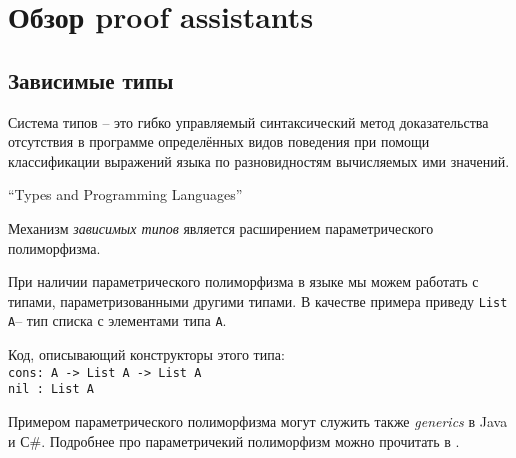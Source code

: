 \documentclass[aps,12pt,final,oneside,onecolumn,musixtex,superscriptaddress,centertags]{article}
\newcommand{\ctab}[0]{\indent\indent}
\newcommand{\ccode}[1]{\mbox{\texttt{#1}}}
\begin{document}
  \section{Обзор proof assistants}
  \subsection{Зависимые типы}

     \setlength{\epigraphwidth}{10cm}
     \epigraph{Система типов -- это гибко управляемый синтаксический метод доказательства отсутствия в программе определённых видов поведения при помощи классификации выражений языка по разновидностям вычисляемых ими значений.}{``Types and Programming Languages''\cite{Pierce:2002:TPL:509043}}

     Механизм \emph{зависимых типов} является расширением параметрического полиморфизма.

     \newcommand{\listtype}[0]{\ccode{List A}} 
     \newcommand{\listcons}[0]{\ccode{cons\hspace{2mm}: A -> List A -> List A}}
     \newcommand{\listnil}[0]{\ccode{nil \hspace{2mm}: List A}}
     \newcommand{\listconst}[0]{
        \ctab\listcons\\
        \ctab\listnil
     }

     При наличии параметрического полиморфизма в языке мы можем работать с типами, параметризованными другими типами. В качестве примера приведу \listtype\:-- тип списка с элементами типа \ccode{A}.

     Код, описывающий конструкторы этого типа:\\
     \listconst
     \newline

     Примером параметрического полиморфизма могут служить также \emph{generics} в Java и С\#. Подробнее про параметричекий полиморфизм можно прочитать в \cite{DBLP:journals/lisp/Strachey00}.

     \newcommand{\vectortype}[0]{\ccode{Vector A (n : N)}}
     \newcommand{\vectorcons}[0]{\ccode{cons\hspace{2mm}: (n : N) -> A -> Vector A n -> Vector A (S n)}}
     \newcommand{\vectornil}[0]{\ccode{nil \hspace{2mm}: Vector A O}}
     \newcommand{\vectorconst}[0]{
     \ctab\vectorcons\\
     \ctab\vectornil\\
     \ctab\ccode{--- S -- конструктор ненулевых натуральных чисел}\\
     \ctab\ccode{--- S n == n + 1}
     }
     \newcommand{\vectorheadtype}[0]{\ccode{(n : N) -> Vector A (S n) -> A}}
\end{document}
